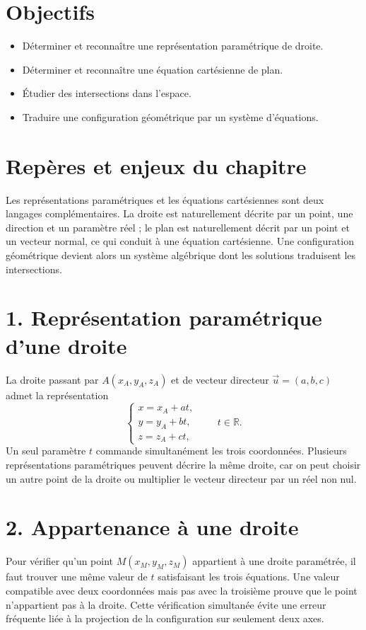 
\section{Objectifs}
\begin{itemize}
\item Déterminer et reconnaître une représentation paramétrique de droite.
\item Déterminer et reconnaître une équation cartésienne de plan.
\item Étudier des intersections dans l’espace.
\item Traduire une configuration géométrique par un système d’équations.
\end{itemize}

\section{Repères et enjeux du chapitre}
Les représentations paramétriques et les équations cartésiennes sont deux langages complémentaires. La droite est naturellement décrite par un point, une direction et un paramètre réel ; le plan est naturellement décrit par un point et un vecteur normal, ce qui conduit à une équation cartésienne. Une configuration géométrique devient alors un système algébrique dont les solutions traduisent les intersections.

\section{1. Représentation paramétrique d’une droite}
La droite passant par $A(x_A,y_A,z_A)$ et de vecteur directeur $\vec u=(a,b,c)$ admet la représentation
\[
\left\{\begin{array}{l}
x=x_A+at,\\
y=y_A+bt,\\
z=z_A+ct,
\end{array}\right.
\qquad t\in\mathbb R.
\]
Un seul paramètre $t$ commande simultanément les trois coordonnées. Plusieurs représentations paramétriques peuvent décrire la même droite, car on peut choisir un autre point de la droite ou multiplier le vecteur directeur par un réel non nul.

\section{2. Appartenance à une droite}
Pour vérifier qu'un point $M(x_M,y_M,z_M)$ appartient à une droite paramétrée, il faut trouver une même valeur de $t$ satisfaisant les trois équations. Une valeur compatible avec deux coordonnées mais pas avec la troisième prouve que le point n'appartient pas à la droite. Cette vérification simultanée évite une erreur fréquente liée à la projection de la configuration sur seulement deux axes.

